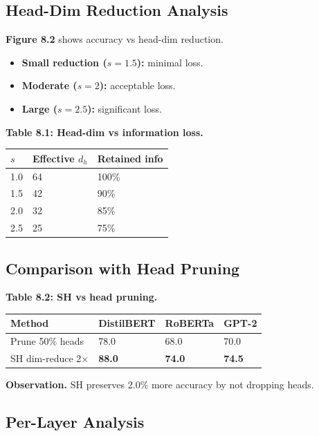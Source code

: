 \subsection{Head-Dim Reduction Analysis}

\textbf{Figure 8.2} shows accuracy vs head-dim reduction.

\begin{itemize}
\item \textbf{Small reduction ($s=1.5$):} minimal loss.
\item \textbf{Moderate ($s=2$):} acceptable loss.
\item \textbf{Large ($s=2.5$):} significant loss.

\end{itemize}
\textbf{Table 8.1: Head-dim vs information loss.}

\begin{table}[H]
\centering
\small
\begin{tabular}{lll}
\toprule
\textbf{$s$} & \textbf{Effective $d_h$} & \textbf{Retained info} \\
\midrule
1.0 & 64 & 100\% \\
1.5 & 42 & 90\% \\
2.0 & 32 & 85\% \\
2.5 & 25 & 75\% \\
\bottomrule
\end{tabular}
\end{table}

\subsection{Comparison with Head Pruning}

\textbf{Table 8.2: SH vs head pruning.}

\begin{table}[H]
\centering
\small
\begin{tabular}{llll}
\toprule
\textbf{Method} & \textbf{DistilBERT} & \textbf{RoBERTa} & \textbf{GPT-2} \\
\midrule
Prune 50\% heads & 78.0 & 68.0 & 70.0 \\
SH dim-reduce 2$\times$ & \textbf{88.0} & \textbf{74.0} & \textbf{74.5} \\
\bottomrule
\end{tabular}
\end{table}

\textbf{Observation.} SH preserves 2.0\% more accuracy by not dropping 
heads.

\subsection{Per-Layer Analysis}

